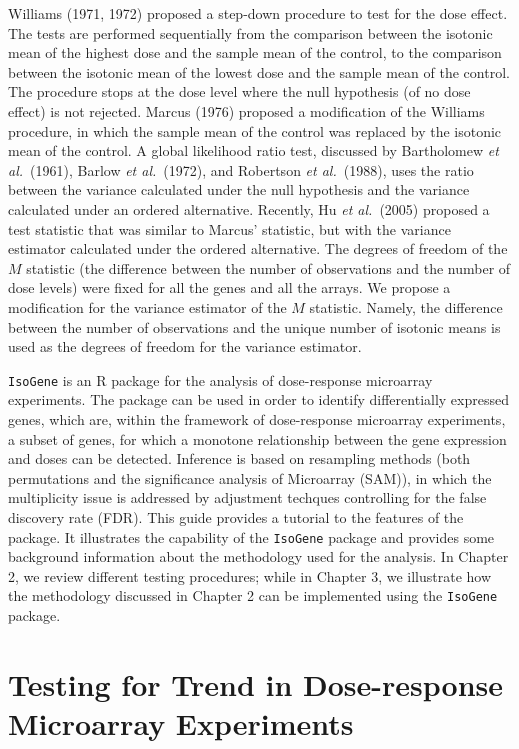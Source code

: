 \documentclass[10pt]{article}
\begin{document}
Williams (1971, 1972) proposed a step-down procedure to test for the
dose effect. The tests are performed sequentially from the
comparison between the isotonic mean of the highest dose and the
sample mean of the control, to the comparison between the isotonic
mean of the lowest dose and the sample mean of the control. The
procedure stops at the dose level where the null hypothesis (of no
dose effect) is not rejected. Marcus (1976) proposed a modification
of the Williams procedure, in which the sample mean of the control
was replaced by the isotonic mean of the control. A global
likelihood ratio test, discussed by Bartholomew \textit{et al.}\
(1961), Barlow \textit{et al.}\ (1972), and Robertson \textit{et
al.}\ (1988), uses the ratio between the variance calculated under
the null hypothesis and the variance calculated under an ordered
alternative. Recently, Hu \textit{et al.}\ (2005) proposed a test
statistic that was similar to Marcus' statistic, but with the
variance estimator calculated under the ordered alternative. The
degrees of freedom of the $M$ statistic (the difference between the
number of observations and the number of dose levels) were fixed for
all the genes and all the arrays. We propose a modification for the
variance estimator of the $M$ statistic. Namely, the difference
between the number of observations and the unique number of isotonic
means is used as the degrees of freedom for the variance estimator.

\texttt{IsoGene} is an R package for the analysis of dose-response microarray experiments. 
The package can be used in order to identify differentially expressed genes, which are, 
within the framework of dose-response microarray experiments, a subset of genes, 
for which a monotone relationship between the gene expression and doses can be detected. 
Inference is based on resampling methods (both permutations and the 
significance analysis of Microarray (SAM)), in which the multiplicity issue is addressed 
by adjustment techques controlling for the false discovery rate (FDR). This guide provides 
a tutorial to the features of the package. It illustrates the capability of the \texttt{IsoGene} 
package and provides some background information about the methodology used for
the analysis. In Chapter 2, we review different testing procedures; while in Chapter 3, we 
illustrate how the methodology discussed in Chapter 2 can be implemented using the 
\texttt{IsoGene} package.


\section{Testing for Trend in Dose-response Microarray Experiments}
\end{document}
